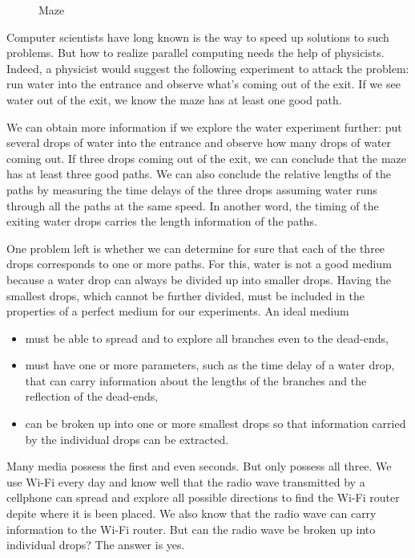 \documentclass[Letter,11pt]{book}
\begin{document}
\begin{figure}[ht]\label{Maze}

\caption{Maze}
\end{figure}

Computer scientists have long known  is the way to speed up solutions to such problems. But how to realize parallel computing needs the help of physicists. Indeed, a physicist would suggest the following experiment to attack the problem: run water into the entrance and observe what's coming out of the exit. If we see water out of the exit, we know the maze has at least one good path.

We can obtain more information if we explore the water experiment further: put several drops of water into the entrance and observe how many drops of water coming out. If three drops coming out of the exit, we can conclude that the maze has at least three good paths. We can also conclude the relative lengths of the paths by measuring the time delays of the three drops assuming water runs through all the paths at the same speed. In another word, the timing of the exiting water drops carries the length information of the paths.

One problem left is whether we can determine for sure that each of the three drops corresponds to one or more paths. For this, water is not a good medium because a water drop can always be divided up into smaller drops. Having the smallest drops, which cannot be further divided, must be included in the properties of a perfect medium for our  experiments. An ideal medium
\begin{itemize}
    \item must be able to spread and to explore all branches even to the dead-ends,
    \item must have one or more parameters, such as the time delay of a water drop, that can carry information about the lengths of the branches and the reflection of the dead-ends,
    \item can be broken up into one or more smallest drops so that information carried by the individual drops can be extracted.
\end{itemize}
Many media possess the first and even seconds. But only  possess all three. We use Wi-Fi every day and know well that the radio wave transmitted by a cellphone can spread and explore all possible directions to find the Wi-Fi router depite where it is been placed. We also know that the radio wave can carry information to the Wi-Fi router. But can the radio wave be broken up into individual drops? The answer is yes.
\end{document}

